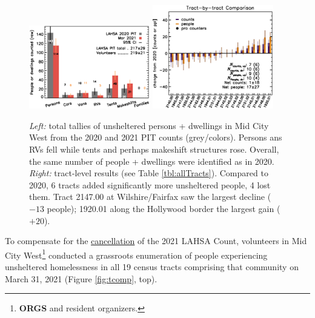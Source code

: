 \documentclass[11pt]{article}
\def\bfr{\bf\color{red}}
\begin{document}
\begin{figure}[h]
	\centering
	\includegraphics[width = 0.47\textwidth, trim = 1cm 0cm 0cm 1cm]{bars}
	\includegraphics[width = 0.47\textwidth, trim = 0cm 0cm 0cm 1cm]{tractsYrYr.eps}	
	\caption{{\it Left:} total tallies of unsheltered persons + dwellings in Mid City West from 
			the 2020 and 2021 PIT counts (grey/colors). Persons ans RVs fell while 
			tents and perhaps makeshift structures rose. Overall, the same number of 
			people + dwellings were identified as in 2020. {\it Right:} tract-level
			results (see Table \ref{tbl:allTracts}). Compared to 2020, 6 tracts 
			added significantly more unsheltered people, 4 lost them. Tract 2147.00
			at Wilshire/Fairfax saw the largest decline ($-13$ people); 1920.01 along
			the Hollywood border the largest gain ($+20$).}
	\label{fig:rawCounts}
\end{figure}


 To compensate for the 
\href{https://laist.com/latest/post/20201209/LAHSA-cancels-2021-homeless-count-los-angeles-covid-19}
{cancellation} of the 2021 LAHSA Count, volunteers in Mid City 
West\footnote{{\bfr ORGS} and resident organizers.} conducted a grassroots enumeration of 
people experiencing unsheltered homelessness 
in all 19 census tracts comprising that community on March 31, 2021 (Figure \ref{fig:tcomp}, top).\\
\end{document}
